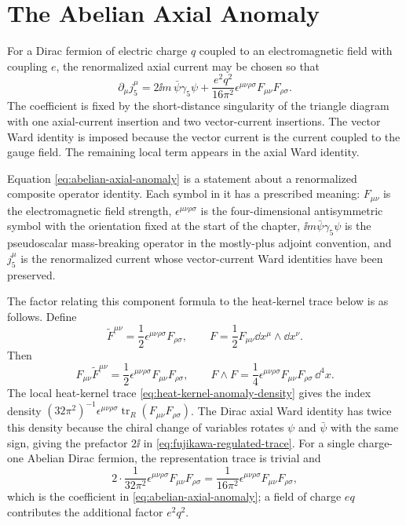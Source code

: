 \section{The Abelian Axial Anomaly}

For a Dirac fermion of electric charge \(q\) coupled to an electromagnetic
field with coupling \(e\), the renormalized axial current may be chosen so
that
\begin{equation}
  \partial_\mu j_5^\mu
  =
  2\ii m\,\bar\psi\gamma_5\psi
  +
  \frac{e^2 q^2}{16\pi^2}
  \epsilon^{\mu\nu\rho\sigma}
  F_{\mu\nu}F_{\rho\sigma}.
  \label{eq:abelian-axial-anomaly}
\end{equation}
The coefficient is fixed by the short-distance singularity of the triangle
diagram with one axial-current insertion and two vector-current insertions.
The vector Ward identity is imposed because the vector current is the current
coupled to the gauge field.  The remaining local term appears in the axial
Ward identity.

Equation \eqref{eq:abelian-axial-anomaly} is a statement about a
renormalized composite operator identity.  Each symbol in it has a prescribed
meaning: \(F_{\mu\nu}\) is the electromagnetic field strength,
\(\epsilon^{\mu\nu\rho\sigma}\) is the four-dimensional antisymmetric symbol
with the orientation fixed at the start of the chapter,
\(\ii m\bar\psi\gamma_5\psi\) is the pseudoscalar mass-breaking operator in the
mostly-plus adjoint convention, and \(j_5^\mu\) is the renormalized current
whose vector-current Ward identities have been preserved.

The factor relating this component formula to the heat-kernel trace below is
as follows.  Define
\[
  \widetilde F^{\mu\nu}
  =
  \frac12\epsilon^{\mu\nu\rho\sigma}F_{\rho\sigma},
  \qquad
  F=\frac12F_{\mu\nu}\dd x^\mu\wedge\dd x^\nu .
\]
Then
\[
  F_{\mu\nu}\widetilde F^{\mu\nu}
  =
  \frac12\epsilon^{\mu\nu\rho\sigma}F_{\mu\nu}F_{\rho\sigma},
  \qquad
  F\wedge F
  =
  \frac14\epsilon^{\mu\nu\rho\sigma}
  F_{\mu\nu}F_{\rho\sigma}\,\dd^4x .
\]
The local heat-kernel trace
\eqref{eq:heat-kernel-anomaly-density} gives the index density
\((32\pi^2)^{-1}\epsilon^{\mu\nu\rho\sigma}
\operatorname{tr}_{R}(F_{\mu\nu}F_{\rho\sigma})\).  The Dirac axial Ward
identity has twice this density because the chiral change of variables rotates
\(\psi\) and \(\bar\psi\) with the same sign, giving the prefactor \(2\ii\) in
\eqref{eq:fujikawa-regulated-trace}.  For a single charge-one Abelian Dirac
fermion, the representation trace is trivial and
\[
  2\cdot
  \frac{1}{32\pi^2}
  \epsilon^{\mu\nu\rho\sigma}F_{\mu\nu}F_{\rho\sigma}
  =
  \frac{1}{16\pi^2}
  \epsilon^{\mu\nu\rho\sigma}F_{\mu\nu}F_{\rho\sigma},
\]
which is the coefficient in \eqref{eq:abelian-axial-anomaly}; a field of
charge \(eq\) contributes the additional factor \(e^2q^2\).

